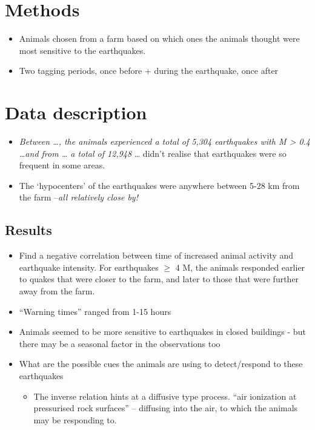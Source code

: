 \documentclass[
]{book}
\providecommand{\tightlist}{%
  \setlength{\itemsep}{0pt}\setlength{\parskip}{0pt}}
\begin{document}
\hypertarget{methods}{%
\section{Methods}\label{methods}}

\begin{itemize}
\item
  Animals chosen from a farm based on which ones the animals thought were most sensitive to the earthquakes.
\item
  Two tagging periods, once before + during the earthquake, once after
\end{itemize}

\hypertarget{data-description}{%
\section{Data description}\label{data-description}}

\begin{itemize}
\item
  \emph{Between \ldots, the animals experienced a total of 5,304 earthquakes with M \textgreater{} 0.4 \ldots and from \ldots{} a total of 12,948} \ldots{} didn't realise that earthquakes were so frequent in some areas.
\item
  The `hypocenters' of the earthquakes were anywhere between 5-28 km from the farm --\emph{all relatively close by!}
\end{itemize}

\hypertarget{results}{%
\subsection{Results}\label{results}}

\begin{itemize}
\item
  Find a negative correlation between time of increased animal activity and earthquake intensity. For earthquakes \(\geq\) 4 M, the animals responded earlier to quakes that were closer to the farm, and later to those that were further away from the farm.
\item
  ``Warning times'' ranged from 1-15 hours
\item
  Animals seemed to be more sensitive to earthquakes in closed buildings - but there may be a seasonal factor in the observations too
\item
  What are the possible cues the animals are using to detect/respond to these earthquakes

  \begin{itemize}
  \tightlist
  \item
    The inverse relation hints at a diffusive type process. ``air ionization at pressurised rock surfaces'' -- diffusing into the air, to which the animals may be responding to.
  \end{itemize}
\end{itemize}
\end{document}
